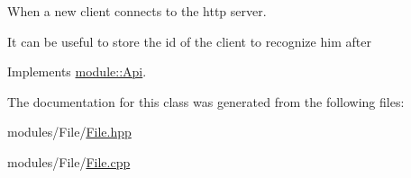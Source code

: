 When a new client connects to the http server. 

It can be useful to store the id of the client to recognize him after 

Implements \hyperlink{structmodule_1_1Api_aa83ddc92765200dd65f915498175c2be}{module\+::\+Api}.



The documentation for this class was generated from the following files\+:\begin{DoxyCompactItemize}
\item 
modules/\+File/\hyperlink{File_8hpp}{File.\+hpp}\item 
modules/\+File/\hyperlink{File_8cpp}{File.\+cpp}\end{DoxyCompactItemize}
